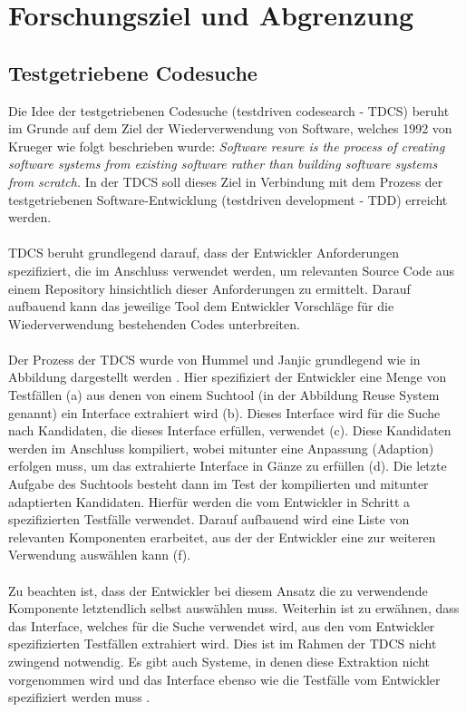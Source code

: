 \chapter{Forschungsziel und Abgrenzung}
\section{Testgetriebene Codesuche}
Die Idee der testgetriebenen Codesuche (testdriven codesearch - TDCS) beruht im Grunde auf dem Ziel der Wiederverwendung von Software, welches 1992 von Krueger wie folgt beschrieben wurde:
\emph{\glqq Software resure is the process of creating software systems from existing software rather than building software systems from scratch.\grqq{}} \cite{krueger} In der TDCS soll dieses Ziel in Verbindung mit dem Prozess der testgetriebenen Software-Entwicklung (testdriven development - TDD) erreicht werden. \cite{hummel08} 
\\\\
TDCS beruht grundlegend darauf, dass der Entwickler Anforderungen spezifiziert, die im Anschluss verwendet werden, um relevanten Source Code aus einem Repository hinsichtlich dieser Anforderungen zu ermittelt. Darauf aufbauend kann das jeweilige Tool dem Entwickler Vorschläge für die Wiederverwendung bestehenden Codes unterbreiten.
\\\\
Der Prozess der TDCS wurde von Hummel und Janjic grundlegend wie in Abbildung  dargestellt werden \cite{Hummel2013}.
\noindent
Hier spezifiziert der Entwickler eine Menge von Testfällen (a) aus denen von einem Suchtool (in der Abbildung \glqq Reuse System\grqq{} genannt) ein Interface extrahiert wird (b). Dieses Interface wird für die Suche nach Kandidaten, die dieses Interface erfüllen, verwendet (c). Diese Kandidaten werden im Anschluss kompiliert, wobei mitunter eine Anpassung (Adaption) erfolgen muss, um das extrahierte Interface in Gänze zu erfüllen (d). Die letzte Aufgabe des Suchtools besteht dann im Test der kompilierten und mitunter adaptierten Kandidaten. Hierfür werden die vom Entwickler in Schritt a spezifizierten Testfälle verwendet. Darauf aufbauend wird eine Liste von relevanten Komponenten erarbeitet, aus der der Entwickler eine zur weiteren Verwendung auswählen kann (f).
\\\\
Zu beachten ist, dass der Entwickler bei diesem Ansatz die zu verwendende Komponente letztendlich selbst auswählen muss. Weiterhin ist zu erwähnen, dass das Interface, welches für die Suche verwendet wird, aus den vom Entwickler spezifizierten Testfällen extrahiert wird. Dies ist im Rahmen der TDCS nicht zwingend notwendig. Es gibt auch Systeme, in denen diese Extraktion nicht vorgenommen wird und das Interface ebenso wie die Testfälle vom Entwickler spezifiziert werden muss \cite{}.
